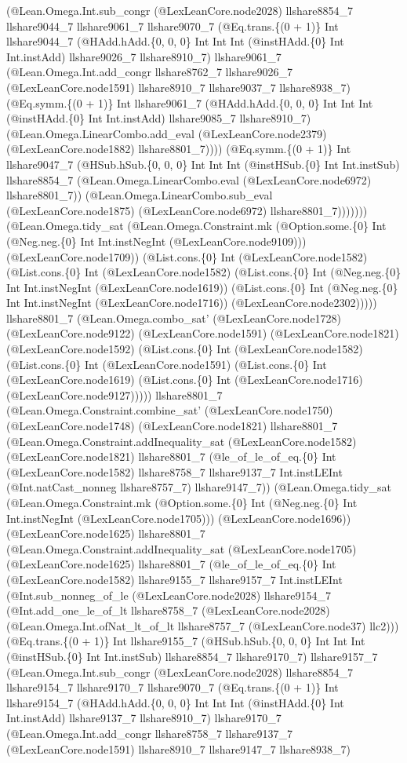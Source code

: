 \documentclass[11pt]{article}
\begin{document}
(@Lean.Omega.Int.sub\_congr (@LexLeanCore.node2028) llshare8854\_7 llshare9044\_7 llshare9061\_7 llshare9070\_7 (@Eq.trans.\{(0 + 1)\} Int llshare9044\_7 (@HAdd.hAdd.\{0, 0, 0\} Int Int Int (@instHAdd.\{0\} Int Int.instAdd) llshare9026\_7 llshare8910\_7) llshare9061\_7 (@Lean.Omega.Int.add\_congr llshare8762\_7 llshare9026\_7 (@LexLeanCore.node1591) llshare8910\_7 llshare9037\_7 llshare8938\_7) (@Eq.symm.\{(0 + 1)\} Int llshare9061\_7 (@HAdd.hAdd.\{0, 0, 0\} Int Int Int (@instHAdd.\{0\} Int Int.instAdd) llshare9085\_7 llshare8910\_7) (@Lean.Omega.LinearCombo.add\_eval (@LexLeanCore.node2379) (@LexLeanCore.node1882) llshare8801\_7)))) (@Eq.symm.\{(0 + 1)\} Int llshare9047\_7 (@HSub.hSub.\{0, 0, 0\} Int Int Int (@instHSub.\{0\} Int Int.instSub) llshare8854\_7 (@Lean.Omega.LinearCombo.eval (@LexLeanCore.node6972) llshare8801\_7)) (@Lean.Omega.LinearCombo.sub\_eval (@LexLeanCore.node1875) (@LexLeanCore.node6972) llshare8801\_7))))))) (@Lean.Omega.tidy\_sat (@Lean.Omega.Constraint.mk (@Option.some.\{0\} Int (@Neg.neg.\{0\} Int Int.instNegInt (@LexLeanCore.node9109))) (@LexLeanCore.node1709)) (@List.cons.\{0\} Int (@LexLeanCore.node1582) (@List.cons.\{0\} Int (@LexLeanCore.node1582) (@List.cons.\{0\} Int (@Neg.neg.\{0\} Int Int.instNegInt (@LexLeanCore.node1619)) (@List.cons.\{0\} Int (@Neg.neg.\{0\} Int Int.instNegInt (@LexLeanCore.node1716)) (@LexLeanCore.node2302))))) llshare8801\_7 (@Lean.Omega.combo\_sat' (@LexLeanCore.node1728) (@LexLeanCore.node9122) (@LexLeanCore.node1591) (@LexLeanCore.node1821) (@LexLeanCore.node1592) (@List.cons.\{0\} Int (@LexLeanCore.node1582) (@List.cons.\{0\} Int (@LexLeanCore.node1591) (@List.cons.\{0\} Int (@LexLeanCore.node1619) (@List.cons.\{0\} Int (@LexLeanCore.node1716) (@LexLeanCore.node9127))))) llshare8801\_7 (@Lean.Omega.Constraint.combine\_sat' (@LexLeanCore.node1750) (@LexLeanCore.node1748) (@LexLeanCore.node1821) llshare8801\_7 (@Lean.Omega.Constraint.addInequality\_sat (@LexLeanCore.node1582) (@LexLeanCore.node1821) llshare8801\_7 (@le\_of\_le\_of\_eq.\{0\} Int (@LexLeanCore.node1582) llshare8758\_7 llshare9137\_7 Int.instLEInt (@Int.natCast\_nonneg llshare8757\_7) llshare9147\_7)) (@Lean.Omega.tidy\_sat (@Lean.Omega.Constraint.mk (@Option.some.\{0\} Int (@Neg.neg.\{0\} Int Int.instNegInt (@LexLeanCore.node1705))) (@LexLeanCore.node1696)) (@LexLeanCore.node1625) llshare8801\_7 (@Lean.Omega.Constraint.addInequality\_sat (@LexLeanCore.node1705) (@LexLeanCore.node1625) llshare8801\_7 (@le\_of\_le\_of\_eq.\{0\} Int (@LexLeanCore.node1582) llshare9155\_7 llshare9157\_7 Int.instLEInt (@Int.sub\_nonneg\_of\_le (@LexLeanCore.node2028) llshare9154\_7 (@Int.add\_one\_le\_of\_lt llshare8758\_7 (@LexLeanCore.node2028) (@Lean.Omega.Int.ofNat\_lt\_of\_lt llshare8757\_7 (@LexLeanCore.node37) llc2))) (@Eq.trans.\{(0 + 1)\} Int llshare9155\_7 (@HSub.hSub.\{0, 0, 0\} Int Int Int (@instHSub.\{0\} Int Int.instSub) llshare8854\_7 llshare9170\_7) llshare9157\_7 (@Lean.Omega.Int.sub\_congr (@LexLeanCore.node2028) llshare8854\_7 llshare9154\_7 llshare9170\_7 llshare9070\_7 (@Eq.trans.\{(0 + 1)\} Int llshare9154\_7 (@HAdd.hAdd.\{0, 0, 0\} Int Int Int (@instHAdd.\{0\} Int Int.instAdd) llshare9137\_7 llshare8910\_7) llshare9170\_7 (@Lean.Omega.Int.add\_congr llshare8758\_7 llshare9137\_7 (@LexLeanCore.node1591) llshare8910\_7 llshare9147\_7 llshare8938\_7) 
\end{document}
